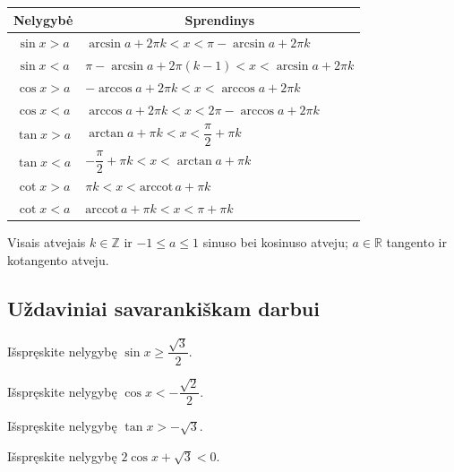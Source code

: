 \begin{center}
\renewcommand{\arraystretch}{2}
\begin{tabular}{|c|l|}
\hline
\textbf{Nelygybė} & \multicolumn{1}{c|}{\textbf{Sprendinys}} \\
\hline
$\sin x > a$ & $\arcsin a + 2\pi k < x < \pi - \arcsin a + 2\pi k$ \\
\hline
$\sin x < a$ & $\pi - \arcsin a + 2\pi(k-1) < x < \arcsin a + 2\pi k$ \\
\hline
$\cos x > a$ & $-\arccos a + 2\pi k < x < \arccos a + 2\pi k$ \\
\hline
$\cos x < a$ & $\arccos a + 2\pi k < x < 2\pi - \arccos a + 2\pi k$ \\
\hline
$\tan x > a$ & $\arctan a + \pi k < x < \dfrac{\pi}{2} + \pi k$ \\
\hline
$\tan x < a$ & $-\dfrac{\pi}{2} + \pi k < x < \arctan a + \pi k$ \\
\hline
$\cot x > a$ & $\pi k < x < \mathrm{arccot}\,a + \pi k$ \\
\hline
$\cot x < a$ & $\mathrm{arccot}\,a + \pi k < x < \pi + \pi k$ \\
\hline
\end{tabular}
\end{center}

\begin{remark}
Visais atvejais $k \in \mathbb{Z}$ ir $-1 \leq a \leq 1$ sinuso bei kosinuso atveju; $a \in \mathbb{R}$ tangento ir kotangento atveju.
\end{remark}

\subsection{Uždaviniai savarankiškam darbui}

\begin{exercise}
Išspręskite nelygybę $\sin x \geq \dfrac{\sqrt{3}}{2}$.
\end{exercise}

\begin{exercise}
Išspręskite nelygybę $\cos x < -\dfrac{\sqrt{2}}{2}$.
\end{exercise}

\begin{exercise}
Išspręskite nelygybę $\tan x > -\sqrt{3}$.
\end{exercise}

\begin{exercise}
Išspręskite nelygybę $2\cos x + \sqrt{3} < 0$.
\end{exercise}

